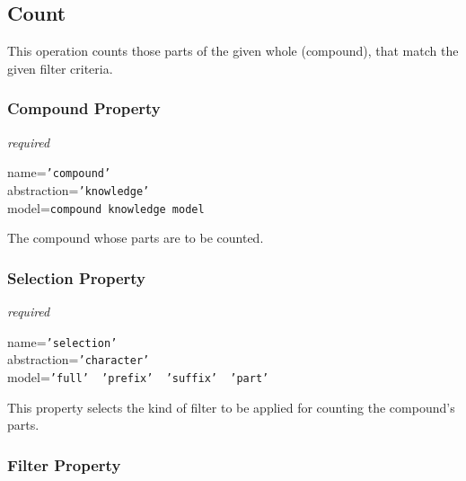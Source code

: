 %
%
%
%
%
%

\subsection{Count}
\label{count_heading}

This operation counts those parts of the given whole (compound), that match the
given filter criteria.

\subsubsection{Compound Property}

\emph{required}

name=\texttt{'compound'}\\
abstraction=\texttt{'knowledge'}\\
model=\texttt{compound knowledge model}

The compound whose parts are to be counted.

\subsubsection{Selection Property}

\emph{required}

name=\texttt{'selection'}\\
abstraction=\texttt{'character'}\\
model=\texttt{'full' \vline\ 'prefix' \vline\ 'suffix' \vline\ 'part'}

This property selects the kind of filter to be applied for counting the
compound's parts.

\subsubsection{Filter Property}

